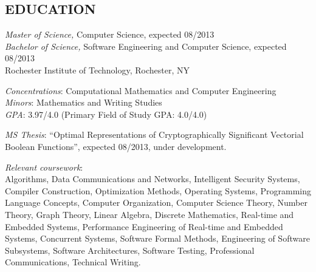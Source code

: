 \documentclass[line,margin]{res}
\begin{document}
\address{71-4 Lilac Drive, Rochester, NY 14620}
\address{caw4567@rit.edu - (315) 806-5939}

\begin{resume}
 
 
\section{EDUCATION} 
		{\sl Master of Science,} Computer Science, expected 08/2013 \\
		{\sl Bachelor of Science,} Software Engineering and Computer Science, expected 08/2013 \\
                Rochester Institute of Technology, Rochester, NY 
\vspace{0.005cm} 

                {\sl Concentrations}: Computational Mathematics and Computer Engineering \\
                {\sl Minors}: Mathematics and Writing Studies \\
	     	{\sl GPA}: 3.97/4.0 (Primary Field of Study GPA: 4.0/4.0) 
\vspace{0.005cm} 

		{\sl MS Thesis}: ``Optimal Representations of Cryptographically Significant Vectorial Boolean Functions'', expected 08/2013, under development.
\vspace{0.005cm} 

		{\sl Relevant coursework}: \\Algorithms, Data Communications and Networks, Intelligent Security Systems, Compiler Construction, Optimization Methods, Operating Systems, Programming Language Concepts, Computer Organization, Computer Science Theory, Number Theory, Graph Theory, Linear Algebra, Discrete Mathematics, Real-time and Embedded Systems, Performance Engineering of Real-time and Embedded Systems, Concurrent Systems, Software Formal Methods, Engineering of Software Subsystems, Software Architectures, Software Testing, Professional Communications, Technical Writing.


\end{resume}
\end{document}
